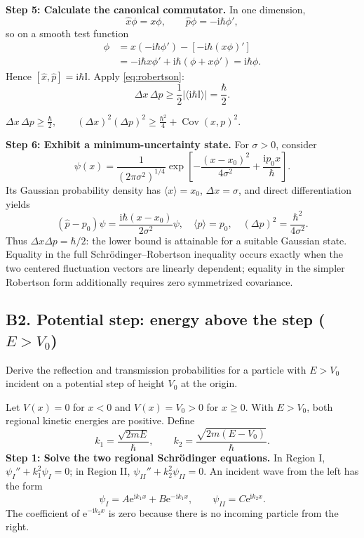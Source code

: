 \documentclass[11pt,a4paper]{article}
\newcommand{\key}[1]{\begin{resultbox}\centering\(\displaystyle #1\)\end{resultbox}}
\newcommand{\iu}{\mathrm{i}}
\newcommand{\ee}{\mathrm{e}}
\newcommand{\id}{\mathbb I}
\newcommand{\Cov}{\operatorname{Cov}}
\newcommand{\Sch}{Schr\"odinger}
\newcommand{\abs}[1]{\left|#1\right|}
\begin{document}
\textbf{Step 5: Calculate the canonical commutator.} In one dimension,
\begin{equation}\hat x\phi=x\phi,\qquad\hat p\phi=-\iu\hbar\phi',\end{equation}
so on a smooth test function
\begin{align}
[\hat x,\hat p]\phi&=x(-\iu\hbar\phi')-[-\iu\hbar(x\phi)']\\
&=-\iu\hbar x\phi'+\iu\hbar(\phi+x\phi')=\iu\hbar\phi.
\end{align}
Hence $[\hat x,\hat p]=\iu\hbar\id$. Apply \eqref{eq:robertson}:
\begin{equation}
\Delta x\,\Delta p\geq\frac12\abs{\langle\iu\hbar\id\rangle}=\frac\hbar2.
\end{equation}
\key{\boxed{\Delta x\,\Delta p\geq\frac\hbar2,\qquad
(\Delta x)^2(\Delta p)^2\geq\frac{\hbar^2}4+\Cov(x,p)^2.}}
\textbf{Step 6: Exhibit a minimum-uncertainty state.} For $\sigma>0$, consider
\begin{equation}
\psi(x)=\frac{1}{(2\pi\sigma^2)^{1/4}}\exp\left[-\frac{(x-x_0)^2}{4\sigma^2}+\frac{\iu p_0 x}{\hbar}\right].
\end{equation}
Its Gaussian probability density has $\langle x\rangle=x_0$, $\Delta x=\sigma$, and direct differentiation yields
\begin{equation}
(\hat p-p_0)\psi=\frac{\iu\hbar(x-x_0)}{2\sigma^2}\psi,\quad
\langle p\rangle=p_0,\quad (\Delta p)^2=\frac{\hbar^2}{4\sigma^2}.
\end{equation}
Thus $\Delta x\Delta p=\hbar/2$: the lower bound is attainable for a suitable Gaussian state. Equality in the full Schr\"odinger--Robertson inequality occurs exactly when the two centered fluctuation vectors are linearly dependent; equality in the simpler Robertson form additionally requires zero symmetrized covariance.

\subsection{B2. Potential step: energy above the step ($E>V_0$)}
\begin{questionbox}
Derive the reflection and transmission probabilities for a particle with $E>V_0$ incident on a potential step of height $V_0$ at the origin.
\end{questionbox}
Let $V(x)=0$ for $x<0$ and $V(x)=V_0>0$ for $x\geq0$. With $E>V_0$, both regional kinetic energies are positive. Define
\begin{equation}
k_1=\frac{\sqrt{2mE}}{\hbar},\qquad k_2=\frac{\sqrt{2m(E-V_0)}}{\hbar}.
\end{equation}
\textbf{Step 1: Solve the two regional \Sch{} equations.} In Region I, $\psi_I''+k_1^2\psi_I=0$; in Region II, $\psi_{II}''+k_2^2\psi_{II}=0$. An incident wave from the left has the form
\begin{equation}
\psi_I=A\ee^{\iu k_1x}+B\ee^{-\iu k_1x},\qquad
\psi_{II}=C\ee^{\iu k_2x}.
\end{equation}
The coefficient of $\ee^{-\iu k_2x}$ is zero because there is no incoming particle from the right.
\end{document}
